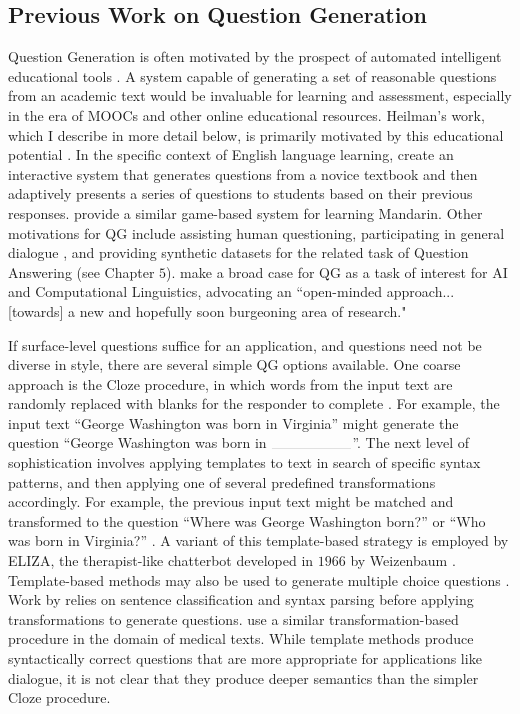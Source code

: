 \subsection{Previous Work on Question Generation}

Question Generation is often motivated by the prospect of automated intelligent educational tools  \citep{graesser2005scaffolding, heilman2011automatic}. A system capable of generating a set of reasonable questions from an academic text would be invaluable for learning and assessment, especially in the era of MOOCs and other online educational resources. Heilman's work, which I describe in more detail below, is primarily motivated by this educational potential  \citep{heilman2011automatic}. In the specific context of English language learning, \citet{kunichika2004automated} create an interactive system that generates questions from a novice textbook and then adaptively presents a series of questions to students based on their previous responses. \citet{xu2009automatic} provide a similar game-based system for learning Mandarin. Other motivations for QG include assisting human questioning, participating in general dialogue  \citep{walker2001spot}, and providing synthetic datasets for the related task of Question Answering (see Chapter $5$). \citet{piwek2008generating} make a broad case for QG as a task of interest for AI and Computational Linguistics, advocating an ``open-minded approach... [towards] a new and hopefully soon burgeoning area of research."

If surface-level questions suffice for an application, and questions need not be diverse in style, there are several simple QG options available. One coarse approach is the Cloze procedure, in which words from the input text are randomly replaced with blanks for the responder to complete  \citep{taylor1953cloze}. For example, the input text ``George Washington was born in Virginia'' might generate the question ``George Washington was born in $\rule{2cm}{0.05mm}$''. The next level of sophistication involves applying templates to text in search of specific syntax patterns, and then applying one of several predefined transformations accordingly. For example, the previous input text might be matched and transformed to the question ``Where was George Washington born?'' or ``Who was born in Virginia?''  \citep{gates2008automatically, kunichika2004automated, heilman2011automatic}. A variant of this template-based strategy is employed by ELIZA, the therapist-like chatterbot developed in $1966$ by Weizenbaum  \citep{weizenbaum1966eliza}. Template-based methods may also be used to generate multiple choice questions  \citep{mitkov2006computer}. Work by \citet{ali2010automatic} relies on sentence classification and syntax parsing before applying transformations to generate questions.  \citet{wang2007automatic} use a similar transformation-based procedure in the domain of medical texts. While template methods produce syntactically correct questions that are more appropriate for applications like dialogue, it is not clear that they produce deeper semantics than the simpler Cloze procedure. 

